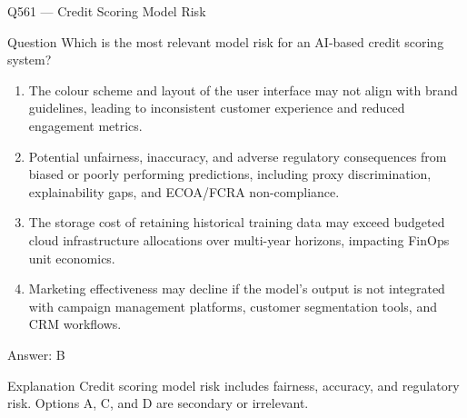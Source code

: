 \documentclass[aspectratio=169,8pt]{beamer}
\begin{document}
	\begin{frame}{Q561 --- Credit Scoring Model Risk}
		\begin{block}{Question}
			Which is the most relevant model risk for an AI-based credit scoring system?
			\begin{enumerate}
				\item The colour scheme and layout of the user interface may not align with brand guidelines, leading to inconsistent customer experience and reduced engagement metrics.
				\item Potential unfairness, inaccuracy, and adverse regulatory consequences from biased or poorly performing predictions, including proxy discrimination, explainability gaps, and ECOA/FCRA non-compliance.
				\item The storage cost of retaining historical training data may exceed budgeted cloud infrastructure allocations over multi-year horizons, impacting FinOps unit economics.
				\item Marketing effectiveness may decline if the model's output is not integrated with campaign management platforms, customer segmentation tools, and CRM workflows.
			\end{enumerate}
		\end{block}
		\begin{exampleblock}{Answer: B}\end{exampleblock}
		\begin{block}{Explanation}
			Credit scoring model risk includes fairness, accuracy, and regulatory risk. Options A, C, and D are secondary or irrelevant.
		\end{block}
	\end{frame}
	
\end{document}
